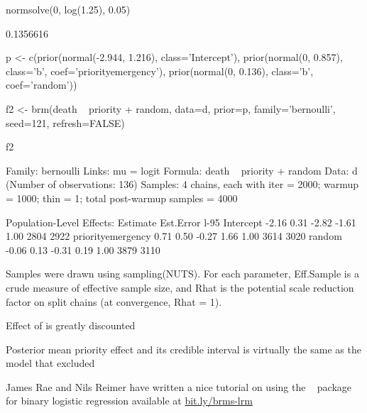 \begin{Schunk}
\begin{Sinput}
normsolve(0, log(1.25), 0.05)
\end{Sinput}
\begin{Soutput}
[1] 0.1356616
\end{Soutput}
\begin{Sinput}
p <- c(prior(normal(-2.944, 1.216), class='Intercept'),
       prior(normal(0, 0.857),      class='b', coef='priorityemergency'),
       prior(normal(0, 0.136),      class='b', coef='random'))

f2 <- brm(death ~ priority + random, data=d, prior=p, family='bernoulli',
          seed=121, refresh=FALSE)
\end{Sinput}
\begin{Sinput}
f2
\end{Sinput}
\begin{Soutput}
 Family: bernoulli 
  Links: mu = logit 
Formula: death ~ priority + random 
   Data: d (Number of observations: 136) 
Samples: 4 chains, each with iter = 2000; warmup = 1000; thin = 1;
         total post-warmup samples = 4000

Population-Level Effects: 
                  Estimate Est.Error l-95%
Intercept            -2.16      0.31    -2.82    -1.61 1.00     2804     2922
priorityemergency     0.71      0.50    -0.27     1.66 1.00     3614     3020
random               -0.06      0.13    -0.31     0.19 1.00     3879     3110

Samples were drawn using sampling(NUTS). For each parameter, Eff.Sample 
is a crude measure of effective sample size, and Rhat is the potential 
scale reduction factor on split chains (at convergence, Rhat = 1).
\end{Soutput}
\end{Schunk}

\bi
\item Effect of  is greatly discounted
\item Posterior mean priority effect and its credible interval is virtually the same as the model that excluded 
\ei

James Rae and Nils Reimer have written a nice tutorial on using the \R~ package for binary logistic regression available at
\href{http://bit.ly/brms-lrm}{bit.ly/brms-lrm}

